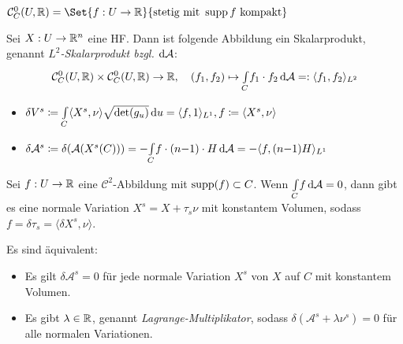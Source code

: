 \documentclass{cheat-sheet}
\newcommand{\A}{\mathcal{A}}
\begin{document}
\begin{nota}
  $\mathcal{C}^0_C(U, \R) = \Set{ f : U \to \R }{ \text{stetig mit } \supp f \text{ kompakt} }$
\end{nota}

\iffalse
  $V = \mathcal{C}^0(C, \R) = \Set{ f : C \to \R }{ \text{stetig} }$

  Skalarprodukt:
  \begin{align*}
    \mathcal{C}^0(C, \R) \times \mathcal{C}^0(C, \R) &\to \R
    (f_1, f_2) &\mapsto \Int{C}{}{f_1 \cdot f_2}{\A} =: \langle f_1 , f_2 \rangle_{L^2}
  \end{align*}
\fi

\begin{defn}
  Sei $X : U \to \mathbb{R}^n$ eine HF. Dann ist folgende Abbildung ein Skalarprodukt, genannt \emph{$L^2$-Skalarprodukt bzgl. $\d \A$}:
  \[
    \mathcal{C}^0_C(U, \R) \times \mathcal{C}^0_C(U, \R) \to \R, \quad
    (f_1, f_2) \mapsto \Int{C}{}{f_1 \cdot f_2}{\A} =: \langle f_1 , f_2 \rangle_{L^2}
  \]
\end{defn}

\begin{nota}
  \begin{itemize}
    \item $\delta V^s \coloneqq {\textstyle \int\limits_{C}^{}} \langle X^s , \nu \rangle \sqrt{\det(g_u)} \,\mathrm{d} u = \langle f , 1 \rangle_{L^1}, f \coloneqq \langle X^s , \nu \rangle$
    \item $\delta \A^s \coloneqq \delta(\A(X^s(C))) = - \Int{C}{}{f \cdot (n{-}1) \cdot H}{\A} = - \langle f, (n{-}1) H \rangle_{L^1}$
  \end{itemize}
\end{nota}




\begin{lem}
  Sei $f : U \to \mathbb{R}$ eine $\mathcal{C}^2$-Abbildung mit $\mathop{\mathrm{supp}}(f) \subset C$. Wenn $\Int{C}{}{f}{\A} = 0$, dann gibt es eine normale Variation $X^s = X + \tau_s \nu$ mit konstantem Volumen, sodass $f = \delta \tau_s = \langle \delta X^s , \nu \rangle$.
\end{lem}

\begin{prop}
  Es sind äquivalent:
  \begin{itemize}
    \item Es gilt $\delta \A^s = 0$ für jede normale Variation $X^s$ von $X$ auf $C$ mit konstantem Volumen.
    \item Es gibt $\lambda \in \mathbb{R}$, genannt \emph{Lagrange-Multiplikator}, sodass $\delta(\A^s + \lambda \nu^s) = 0$ für alle normalen Variationen.
  \end{itemize}
\end{prop}
\end{document}
